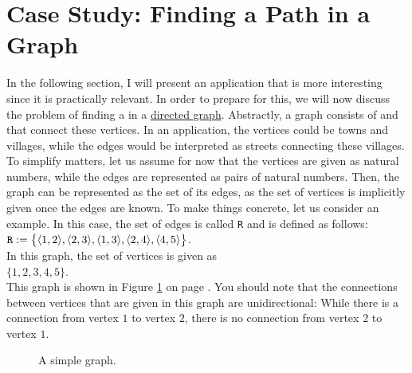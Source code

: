 \section{Case Study: Finding a Path in a Graph}
In the following section, I will present an application that is more interesting since it is practically
relevant.  In order to prepare for this, we will now discuss the problem of finding a  in a
\href{https://en.wikipedia.org/wiki/Directed_graph}{directed graph}. 
Abstractly, a graph consists of  and  that connect these vertices.  In an application, the
vertices could be towns and villages, while the edges would be interpreted as streets connecting these
villages.  To simplify matters, let us assume for now that the vertices are given as natural numbers, while the
edges are represented as pairs of natural numbers.  Then, the graph can be represented as the set of its edges,
as the set of vertices is implicitly given once the edges are known.  To make things concrete, let us consider
an example.  In this case, the set of edges is called \texttt{R} and is defined as follows: 
\\[0.2cm]
\hspace*{1.3cm}
$\texttt{R}\; \mathtt{:=}\; \bigl\{ \pair(1,2), \pair(2,3), \pair(1,3), \pair(2,4), \pair(4,5) \bigr\}$.
\\[0.2cm]
In this graph, the set of vertices is given as
\\[0.2cm]
\hspace*{1.3cm}
$\{ 1, 2, 3, 4, 5 \}$.
\\[0.2cm]
This graph is shown in Figure \ref{fig:graph0} on page \pageref{fig:graph0}.  You should note that the
connections between vertices that are given in this graph are unidirectional:  While there is a connection from
vertex $1$ to vertex $2$, there is no connection from vertex $2$ to vertex $1$.

 
\begin{figure}[!ht]
  \centering

  \caption{A simple graph.}
  \label{fig:graph0}
\end{figure}



